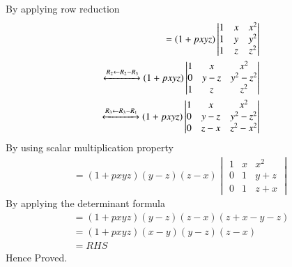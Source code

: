 \documentclass[journal,12pt,twocolumn]{IEEEtran}
\begin{document}
By applying row reduction
\begin{align}
=(1+pxyz)\begin{vmatrix}
1&x&x^2\\1&y&y^2\\1&z&z^2
\end{vmatrix}\\
 \xleftrightarrow[]{R_2 \leftarrow R_2-R_3}
(1+pxyz)\begin{vmatrix}
1&x&x^2\\0&y-z&y^2-z^2\\1&z&z^2
\end{vmatrix}\\
 \xleftrightarrow[]{R_3 \leftarrow R_3-R_1}
(1+pxyz)\begin{vmatrix}
1&x&x^2\\0&y-z&y^2-z^2\\0&z-x&z^2-x^2
\end{vmatrix}
\end{align}
By using scalar multiplication property
\begin{align}
=(1+pxyz)(y-z)(z-x)\begin{vmatrix}
1&x&x^2\\0&1&y+z\\0&1&z+x
\end{vmatrix}
\end{align}
By applying the determinant formula
\begin{align}
=(1+pxyz)(y-z)(z-x)(z+x-y-z)\\
=(1+pxyz)(x-y)(y-z)(z-x)\\
= RHS
\end{align}
Hence Proved.
\end{document}
